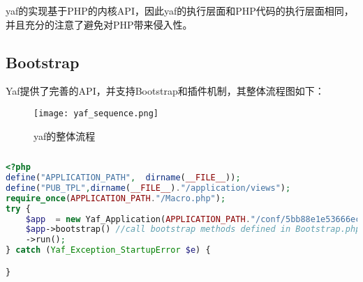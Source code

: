 yaf的实现基于PHP的内核API，因此yaf的执行层面和PHP代码的执行层面相同，并且充分的注意了避免对PHP带来侵入性。



\subsection{Bootstrap}

Yaf提供了完善的API，并支持Bootstrap和插件机制，其整体流程图如下：

\begin{figure}[htbp]
\centering
\texttt{[image: yaf\_sequence.png]}
\caption{yaf的整体流程}
\end{figure}



\begin{lstlisting}[language=PHP]

\end{lstlisting}




\begin{lstlisting}[language=PHP]
<?php
define("APPLICATION_PATH",  dirname(__FILE__));
define("PUB_TPL",dirname(__FILE__)."/application/views");
require_once(APPLICATION_PATH."/Macro.php");
try {
	$app  = new Yaf_Application(APPLICATION_PATH."/conf/5bb88e1e53666ec494f1025023c16dea.ini");
	$app->bootstrap() //call bootstrap methods defined in Bootstrap.php
    ->run();
} catch (Yaf_Exception_StartupError $e) {

}
\end{lstlisting}




\begin{lstlisting}[language=PHP]

\end{lstlisting}



\begin{lstlisting}[language=PHP]

\end{lstlisting}




\begin{lstlisting}[language=PHP]

\end{lstlisting}




\begin{lstlisting}[language=PHP]

\end{lstlisting}




\begin{lstlisting}[language=PHP]

\end{lstlisting}




\begin{lstlisting}[language=PHP]

\end{lstlisting}








